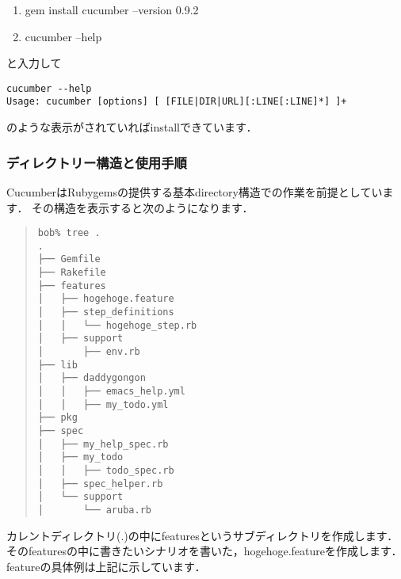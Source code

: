 \begin{enumerate}
\item gem install cucumber --version 0.9.2
\item cucumber --help
\end{enumerate}
と入力して
\begin{lstlisting}[style=customCsh,basicstyle={\scriptsize\ttfamily}]
cucumber --help
Usage: cucumber [options] [ [FILE|DIR|URL][:LINE[:LINE]*] ]+
\end{lstlisting}
のような表示がされていればinstallできています．

\subsubsection{ディレクトリー構造と使用手順}
CucumberはRubygemsの提供する基本directory構造での作業を前提としています．
その構造を表示すると次のようになります．
\begin{quote}\begin{verbatim}
bob% tree .
.
├── Gemfile
├── Rakefile
├── features
│   ├── hogehoge.feature
│   ├── step_definitions
│   │   └── hogehoge_step.rb
│   ├── support
│       ├── env.rb
├── lib
│   ├── daddygongon
│   │   ├── emacs_help.yml
│   │   ├── my_todo.yml
├── pkg
├── spec
│   ├── my_help_spec.rb
│   ├── my_todo
│   │   ├── todo_spec.rb
│   ├── spec_helper.rb
│   └── support
│       └── aruba.rb
\end{verbatim}\end{quote}
カレントディレクトリ(.)の中にfeaturesというサブディレクトリを作成します．
そのfeaturesの中に書きたいシナリオを書いた，hogehoge.featureを作成します．
featureの具体例は上記に示しています．

